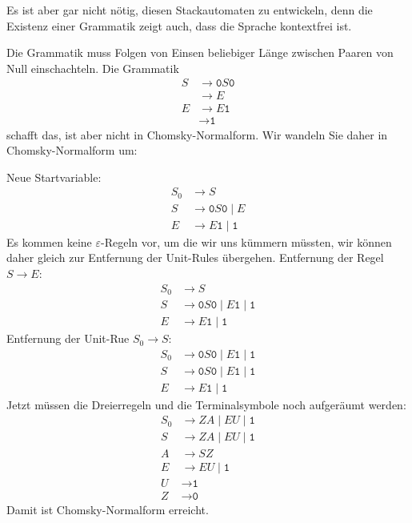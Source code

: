 \begin{loesung}
\begin{center}
\end{center}
Es ist aber gar nicht nötig, diesen Stackautomaten zu entwickeln, denn 
die Existenz einer Grammatik zeigt auch, dass die Sprache kontextfrei ist.

Die Grammatik muss Folgen von Einsen beliebiger Länge zwischen Paaren
von Null einschachteln.
Die Grammatik
\begin{align*}
S&\to \texttt{0}S\texttt{0}
\\
 &\to E
\\
E&\to E\texttt{1}\\
 &\to \texttt{1}
\end{align*}
schafft das, ist aber nicht in Chomsky-Normalform.
Wir wandeln Sie daher in Chomsky-Normalform um:

Neue Startvariable:
\begin{align*}
S_0&\to S
\\
S&\to \texttt{0}S\texttt{0} \mid  E
\\
E&\to E\texttt{1} \mid  \texttt{1}
\end{align*}
Es kommen keine $\varepsilon$-Regeln vor, um die wir uns kümmern müssten,
wir können daher gleich zur Entfernung der Unit-Rules übergehen.
Entfernung der Regel $S\to E$:
\begin{align*}
S_0&\to S
\\
S&\to \texttt{0}S\texttt{0} \mid  E\texttt{1} \mid  \texttt{1}
\\
E&\to E\texttt{1} \mid   \texttt{1}
\end{align*}
Entfernung der Unit-Rue $S_0\to S$:
\begin{align*}
S_0&\to \texttt{0}S\texttt{0} \mid  E\texttt{1} \mid  \texttt{1}
\\
S&\to \texttt{0}S\texttt{0} \mid  E\texttt{1} \mid  \texttt{1}
\\
E&\to E\texttt{1} \mid  \texttt{1}
\end{align*}
Jetzt müssen die Dreierregeln und die Terminalsymbole noch aufgeräumt werden:
\begin{align*}
S_0&\to ZA \mid  EU \mid  \texttt{1}
\\
S&\to ZA \mid  EU \mid  \texttt{1}
\\
A&\to SZ
\\
E&\to EU \mid  \texttt{1}
\\
U&\to \texttt{1}
\\
Z&\to \texttt{0}
\end{align*}
Damit ist Chomsky-Normalform erreicht.
\end{loesung}

